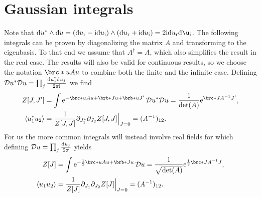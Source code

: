 \documentclass[english, parskip=full]{scrartcl}
\title{\titel}
\author{\autor}
\date{\today}
\begin{document}
\maketitle  %


\section{Gaussian integrals}
Note that $\d u^\ast\wedge\d u = \kla*{\d u_\r - \i\d u_\i} \wedge \kla*{\d u_\r + \i\d u_\i} = 2\i\d u_\r \d\u_\i$.
The following integrals can be proven by diagonalizing the matrix $A$ and transforming to the eigenbasis.
To that end we assume that $A^\dagger = A$, which also simplifies the result in the real case.
The results will also be valid for continuous results, so we choose the notation $\brc*{u}{A}{u}$ to combine both the finite and the infinite case.
Defining $\mathcal{D}u^\ast\mathcal{D}u = \prod_j \frac{\text{d} u_j^\ast\text{d} u_j}{2\pi\text{i}}$ we find
\begin{align}
Z[J,J'] &= \int \powe{-\brc*{u}{A}{u} + \brb*{J}{u} + \brb*{u}{J'}} \,\mathcal{D}u^\ast\mathcal{D}u = \frac{1}{\det(A)} \powe{\brc*{J}{A^{-1}}{J'}} \label{eqn:gauss_c_jj'},\\
\bra*{u_1^\ast u_2} &= \frac{1}{Z[J,J]} \partial_{J_1^\ast} \partial_{J_2} Z[J,J] \Big\vert_{J=0} = (A^{-1})_{12} \label{eqn:gauss_c_expval_12}.
\end{align}
For us the more common integrals will instead involve real fields for which defining $\mathcal{D}u = \prod_j \frac{\text{d} u_j}{2\pi}$ yields
\begin{align}
Z[J] &= \int \powe{-\frac{1}{2} \brc*{u}{A}{u} + \brb*{J}{u}} \,\mathcal{D}u = \frac{1}{\sqrt{\det(A)}} \powe{\frac{1}{2} \brc*{J}{A^{-1}}{J}} \label{eqn:gauss_r_j},\\
\bra*{u_1u_2} &= \frac{1}{Z[J]} \partial_{J_1} \partial_{J_2} Z[J] \Big\vert_{J=0} = (A^{-1})_{12} \label{eqn:gauss_r_expval_12}.
\end{align}
\end{document}
